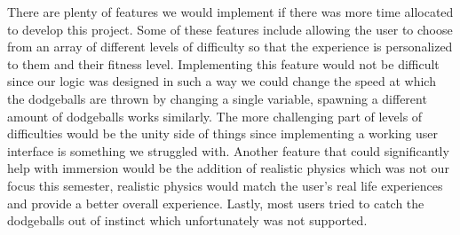 \documentclass{sigchi}
\begin{document}
There are plenty of features we would implement if there was more time allocated to develop this project. Some of these features include allowing the user to choose from an array of different levels of difficulty so that the experience is personalized to them and their fitness level. Implementing this feature would not be difficult since our logic was designed in such a way we could change the speed at which the dodgeballs are thrown by changing a single variable, spawning a different amount of dodgeballs works similarly. The more challenging part of levels of difficulties would be the unity side of things since implementing a working user interface is something we struggled with. Another feature that could significantly help with immersion would be the addition of realistic physics which was not our focus this semester, realistic physics would match the user’s real life experiences and provide a better overall experience. Lastly, most users tried to catch the dodgeballs out of instinct which unfortunately was not supported.   

\balance{}

\balance{}



\end{document}
